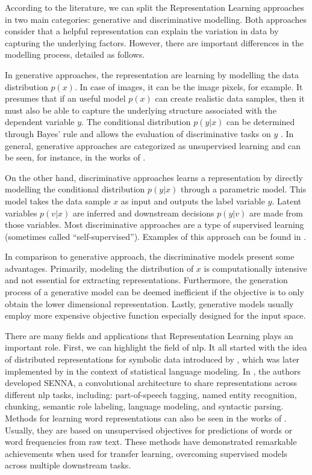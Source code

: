 According to the literature, we can split the Representation Learning approaches in two main categories: generative and discriminative modelling. Both approaches consider that a helpful representation can explain the variation in data by capturing the underlying factors. However, there are important differences in the modelling process, detailed as follows.

In generative approaches, the representation are learning by modelling the data distribution $p(x)$. In case of images, it can be the image pixels, for example. It presumes that if an useful model $p(x)$ can create realistic data samples, then it must also be able to capture the underlying structure associated with the dependent variable $y$. The conditional distribution $p(y|x)$ can be determined through Bayes' rule and allows the evaluation of discriminative tasks on $y$ \citep{le2020contrastive}. In general, generative approaches are categorized as unsupervised learning and can be seen, for instance, in the works of \cite{NIPS2014_5ca3e9b1, kingma2013auto}.

On the other hand, discriminative approaches learns a representation by directly modelling the conditional distribution $p(y|x)$ through a parametric model. This model takes the data sample $x$ as input and outputs the label variable $y$. Latent variables $p(v|x)$ are inferred and downstream decisions $p(y|v)$ are made from those variables. Most discriminative approaches are a type of supervised learning (sometimes called ``self-supervised''). Examples of this approach can be found in \citep{dosovitskiy2014discriminative, Zhang_2017_CVPR}.

In comparison to generative approach, the discriminative models present some advantages. Primarily, modeling the distribution of $x$ is computationally intensive and not essential for extracting representations. Furthermore, the generation process of a generative model can be deemed inefficient if the objective is to only obtain the lower dimensional representation. Lastly, generative models usually employ more expensive objective function especially designed for the input space.

There are many fields and applications that Representation Learning plays an important role. First, we can highlight the field of \acl{nlp}. It all started with the idea of distributed representations for symbolic data introduced by \cite{hinton1986learning}, which was later implemented by \cite{bengio2000neural} in the context of statistical language modeling. In \citep{collobert2011natural}, the authors developed SENNA, a convolutional architecture to share representations across different \acs{nlp} tasks, including: part-of-speech tagging, named entity recognition, chunking, semantic role labeling, language modeling, and syntactic parsing. Methods for learning word representations can also be seen in the works of \cite{mnih2013learning, pennington2014glove}. Usually, they are based on unsupervised objectives for predictions of words or word frequencies from raw text. These methods have demonstrated remarkable achievements when used for transfer learning, overcoming supervised models across multiple downstream tasks.


